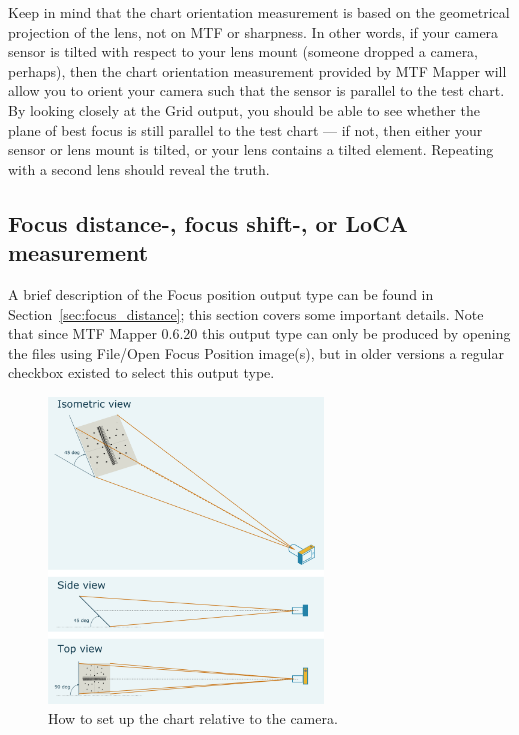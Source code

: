 \documentclass[a4paper]{article}
\begin{document}
Keep in mind that the chart orientation measurement is based on the
geometrical projection of the lens, not on MTF or sharpness. In other words,
if your camera sensor is tilted with respect to your lens mount (someone
dropped a camera, perhaps), then the chart orientation measurement provided
by MTF Mapper will allow you to orient your camera such that the sensor is
parallel to the test chart. By looking closely at the \textsf{Grid} output,
you should be able to see whether the plane of best focus is still parallel
to the test chart --- if not, then either your sensor or lens mount is
tilted, or your lens contains a tilted element. Repeating with a second lens
should reveal the truth.

\subsection{Focus distance-, focus shift-, or LoCA measurement}
\label{sec:focus_distance_details}
A brief description of the \textsf{Focus position} output type can be found in
Section~\ref{sec:focus_distance}; this section covers some important
details. Note that since MTF Mapper 0.6.20 this output type can only 
be produced by opening the files using \textsf{File/Open Focus Position
image(s)}, but in older versions a regular checkbox existed to select this 
output type.

\begin{figure}[ht!]
\centering
\includegraphics[width=0.65\textwidth]{figures/focus_chart_diagram}
\caption{How to set up the chart relative to the camera.}
\label{fig:focus_diagram}
\end{figure}
\end{document}
